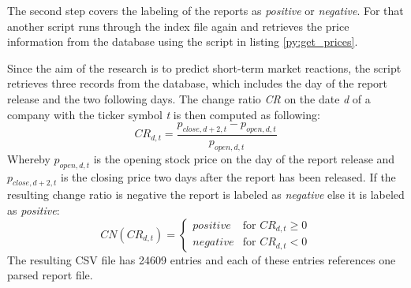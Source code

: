 The second step covers the labeling of the reports as \textit{positive} or \textit{negative}.
For that another script runs through the index file again and retrieves the price information from the database using the script in listing \ref{py:get_prices}.

Since the aim of the research is to predict short-term market reactions, the script retrieves three records from the database, which includes the day of the report release and the two following days.
The change ratio \textit{CR} on the date \textit{d} of a company with the ticker symbol \textit{t} is then computed as following:
\begin{equation}
    CR_{d,t} = \frac{p_{close, d + 2, t} - p_{open, d, t}}{p_{open, d, t}}
\end{equation}
Whereby $p_{open, d, t}$ is the opening stock price on the day of the report release and $p_{close, d + 2, t}$ is the closing price two days after the report has been released.
If the resulting change ratio is negative the report is labeled as \textit{negative} else it is labeled as \textit{positive}:
\begin{equation}
    CN(CR_{d,t}) = \begin{cases}
        positive & \text{for } CR_{d,t} \geq 0 \\
        negative & \text{for } CR_{d,t} < 0
    \end{cases}
\end{equation}
The resulting \ac{CSV} file has 24609 entries and each of these entries references one parsed report file.

